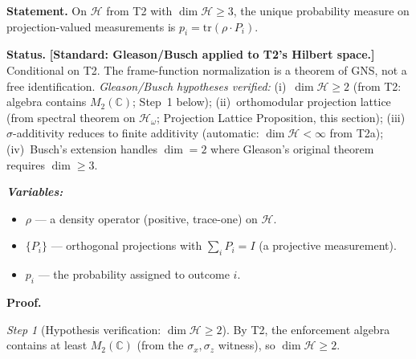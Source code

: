 \documentclass[11pt]{article}
\theoremstyle{remark}
\newenvironment{varlist}{\begin{itemize}[nosep,leftmargin=2em]}{\end{itemize}}
\begin{document}
\begin{tcolorbox}[apfbox, title={$T_{\mathrm{Born}}$: Born Rule from Admissibility Invariance}]
\textbf{Statement.}  On $\mathcal{H}$ from T2 with $\dim \mathcal{H} \ge 3$, the unique probability measure on projection-valued measurements is $p_i = \mathrm{tr}(\rho \cdot P_i)$.

\smallskip\noindent\textbf{Status.}  \textbf{[Standard: Gleason/Busch applied to T2's Hilbert space.]}  Conditional on T2.  The frame-function normalization is a theorem of GNS, not a free identification.  \textit{Gleason/Busch hypotheses verified:} (i)~$\dim \mathcal{H} \ge 2$ (from T2: algebra contains $M_2(\mathbb{C})$; Step~1 below); (ii)~orthomodular projection lattice (from spectral theorem on $\mathcal{H}_\omega$; Projection Lattice Proposition, this section); (iii)~$\sigma$-additivity reduces to finite additivity (automatic: $\dim \mathcal{H} < \infty$ from T2a); (iv)~Busch's extension handles $\dim = 2$ where Gleason's original theorem requires $\dim \ge 3$.

\smallskip\noindent\textbf{\textit{Variables:}}
\begin{varlist}
\item $\rho$ --- a density operator (positive, trace-one) on $\mathcal{H}$.
\item $\{P_i\}$ --- orthogonal projections with $\sum_i P_i = I$ (a projective measurement).
\item $p_i$ --- the probability assigned to outcome $i$.
\end{varlist}

\smallskip\noindent\textbf{Proof.}

\textit{Step 1} (Hypothesis verification: $\dim \mathcal{H} \ge 2$).  By T2, the enforcement algebra contains at least $M_2(\mathbb{C})$ (from the $\sigma_x, \sigma_z$ witness), so $\dim \mathcal{H} \ge 2$.


\end{tcolorbox}
\end{document}
